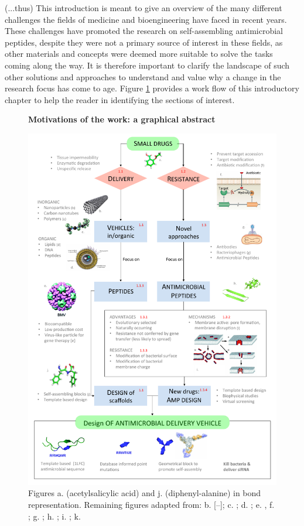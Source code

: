 \vspace{1cm}
(...thus) This introduction is meant to give an overview of the many different challenges the fields of medicine and bioengineering have faced in recent years. These challenges have promoted the research on self-assembling antimicrobial peptides, despite they were not a primary source of interest in these fields, as other materials and concepts were deemed more suitable to solve the tasks coming along the way. It is therefore important to clarify the landscape of such other solutions and approaches to understand and value why a change in the research focus has come to age. Figure \ref{fig:intro} provides a work flow of this introductory chapter to help the reader in identifying the sections of interest.

\begin{figure}
\begin{center}
\Large{\textbf{Motivations of the work: a graphical abstract}}\par\bigskip
\includegraphics[width = \textwidth]{1introduction/pics/scheme_intro}
\caption[Graphical abstract of introduction]{Figures a. (acetylsalicylic acid) and j. (diphenyl-alanine) in bond representation. Remaining figures adapted from: b. [--]; c. \cite{poly}; d. \cite{lipo}; e. \cite{Schoonen2014}, f. \cite{Blair2014}; g. \cite{phage}; h. \cite{Torres2019}; i. \cite{Nguyen2011}; k. \cite{Castelletto2016}} \label{fig:intro}
\end{center}
\end{figure}

